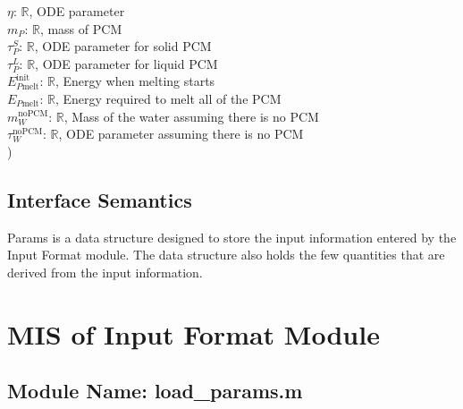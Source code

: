 \documentclass[12pt]{article}
\begin{document}
$\eta$: $\mathbb{R}$, ODE parameter\\
$m_P$: $\mathbb{R}$, mass of PCM\\
$\tau^S_P$: $\mathbb{R}$, ODE parameter for solid PCM\\
$\tau^L_P$: $\mathbb{R}$, ODE parameter for liquid PCM\\
$E_{P\text{melt}}^{\text{init}}$: $\mathbb{R}$, Energy when melting starts\\
$E_{P\text{melt}}$: $\mathbb{R}$, Energy required to melt all of the PCM\\
$m_W^\text{noPCM}$: $\mathbb{R}$, Mass of the water assuming there is no PCM\\
$\tau_W^{\text{noPCM}}$: $\mathbb{R}$, ODE parameter assuming there is no PCM\\
)


\subsection{Interface Semantics}

Params is a data structure designed to store the input information entered by
the Input Format module.  The data structure also holds the few quantities that
are derived from the input information.


\section{MIS of Input Format Module}

\subsection{Module Name: load\_{params}.m}


\end{document}
